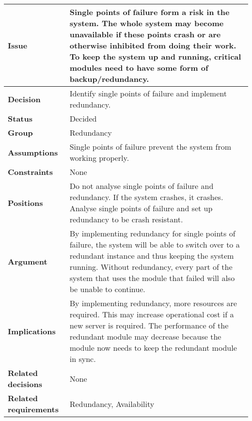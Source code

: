 
\label{dd:redundancy}
\begin{tabular}{ l  p{10cm}}
\hline
\bf Issue & Single points of failure form a risk in the system. The whole system may become unavailable if these points crash or are otherwise inhibited from doing their work. To keep the system up and running, critical modules need to have some form of backup/redundancy. \\
\hline
\bf Decision & Identify single points of failure and implement redundancy. \\
\hline
\bf Status & Decided \\
\hline
\bf Group & Redundancy \\
\hline
\bf Assumptions & Single points of failure prevent the system from working properly. \\
\hline
\bf Constraints & None \\
\hline
\bf Positions & Do not analyse single points of failure and redundancy. If the system crashes, it crashes. \newline \newline
Analyse single points of failure and set up redundancy to be crash resistant. \\
\hline
\bf Argument & By implementing redundancy for single points of failure, the system will be able to switch over to a redundant instance and thus keeping the system running. Without redundancy, every part of the system that uses the module that failed will also be unable to continue. \\
\hline
\bf Implications & By implementing redundancy, more resources are required. This may increase operational cost if a new server is required. The performance of the redundant module may decrease because the module now needs to keep the redundant module in sync. \\
\hline
\bf Related decisions & None \\
\hline
\bf Related requirements & Redundancy, Availability \\
\hline
\end{tabular}
